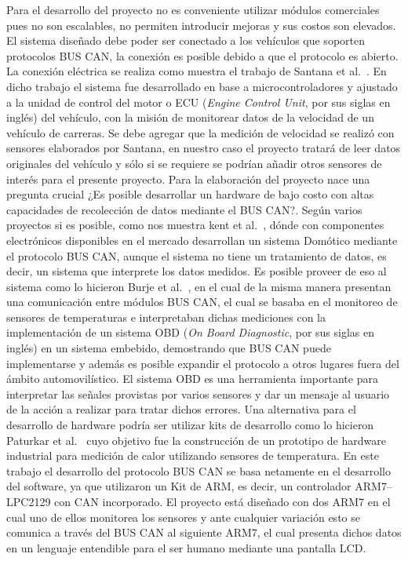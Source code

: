 Para el desarrollo del proyecto no es conveniente utilizar módulos comerciales pues no son escalables, no permiten introducir mejoras y sus costos son elevados. 
El sistema diseñado debe poder ser conectado a los vehículos que soporten protocolos BUS CAN, la conexión es posible debido a que el protocolo es abierto. 
La conexión eléctrica se realiza como muestra el trabajo de Santana et al.~\cite{DISM}. 
En dicho trabajo el sistema fue desarrollado en base a microcontroladores y ajustado a la unidad de control del motor o ECU (\textit{Engine Control Unit}, por sus siglas en inglés) del vehículo, con la misión de monitorear datos de la velocidad de un vehículo de carreras. 
Se debe agregar que la medición de velocidad se realizó con sensores elaborados por Santana, en nuestro caso el proyecto tratará de leer datos originales del vehículo y sólo si se requiere se podrían añadir otros sensores de interés para el presente proyecto. 
Para la elaboración del proyecto nace una pregunta crucial ¿Es posible desarrollar un hardware de bajo costo con altas capacidades de recolección de datos mediante el BUS CAN?.
Según varios proyectos si es posible,  como nos muestra kent et al.~\cite{HAMS}, dónde con componentes electrónicos disponibles en el mercado desarrollan un sistema Domótico mediante el protocolo BUS CAN, aunque el sistema no tiene un tratamiento de datos, es decir, un sistema que interprete los datos medidos. 
Es posible proveer de eso al sistema como lo hicieron  Burje et al.~\cite{EOBD}, en el cual de la misma manera presentan una comunicación entre módulos BUS CAN, el cual se basaba en el monitoreo de sensores de temperaturas e interpretaban dichas mediciones con la implementación de un sistema OBD (\textit{On Board Diagnostic}, por sus siglas en inglés) en un sistema embebido, demostrando que BUS CAN puede implementarse y además es posible expandir el protocolo a otros lugares fuera del ámbito automovilístico. 
El sistema OBD es una herramienta importante para interpretar las señales provistas por varios sensores y dar un mensaje al usuario de la acción a realizar para tratar dichos errores. 
Una alternativa para el desarrollo de hardware podría ser utilizar kits de desarrollo como lo hicieron Paturkar et al.~\cite{AABT} cuyo objetivo fue la construcción de un prototipo de hardware industrial para medición de calor utilizando sensores de temperatura. 
En este trabajo el desarrollo del protocolo BUS CAN se basa netamente en el desarrollo del software, ya que utilizaron un Kit de ARM, es decir, un controlador ARM7–LPC2129 con CAN incorporado. 
El proyecto está diseñado con dos ARM7 en el cual uno de ellos monitorea los sensores y ante cualquier variación esto se comunica a través del BUS CAN al siguiente ARM7, el cual presenta dichos datos en un lenguaje entendible para el ser humano mediante una pantalla LCD. 
